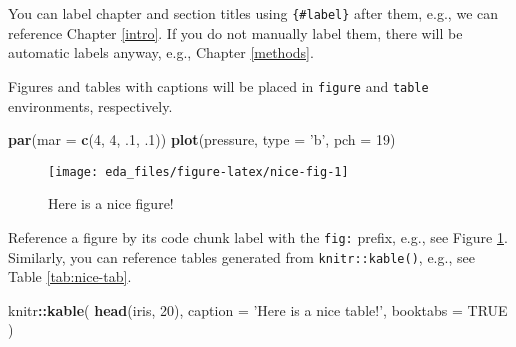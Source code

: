 \documentclass[]{book}
\newenvironment{Shaded}{\begin{snugshade}}{\end{snugshade}}
\newcommand{\KeywordTok}[1]{\textcolor[rgb]{0.13,0.29,0.53}{\textbf{#1}}}
\newcommand{\DataTypeTok}[1]{\textcolor[rgb]{0.13,0.29,0.53}{#1}}
\newcommand{\DecValTok}[1]{\textcolor[rgb]{0.00,0.00,0.81}{#1}}
\newcommand{\StringTok}[1]{\textcolor[rgb]{0.31,0.60,0.02}{#1}}
\newcommand{\OtherTok}[1]{\textcolor[rgb]{0.56,0.35,0.01}{#1}}
\newcommand{\OperatorTok}[1]{\textcolor[rgb]{0.81,0.36,0.00}{\textbf{#1}}}
\newcommand{\NormalTok}[1]{#1}
\theoremstyle{definition}
\theoremstyle{definition}
\theoremstyle{definition}
\theoremstyle{remark}
\begin{document}
You can label chapter and section titles using \texttt{\{\#label\}}
after them, e.g., we can reference Chapter \ref{intro}. If you do not
manually label them, there will be automatic labels anyway, e.g.,
Chapter \ref{methods}.

Figures and tables with captions will be placed in \texttt{figure} and
\texttt{table} environments, respectively.

\begin{Shaded}
\begin{Highlighting}[]
\KeywordTok{par}\NormalTok{(}\DataTypeTok{mar =} \KeywordTok{c}\NormalTok{(}\DecValTok{4}\NormalTok{, }\DecValTok{4}\NormalTok{, .}\DecValTok{1}\NormalTok{, .}\DecValTok{1}\NormalTok{))}
\KeywordTok{plot}\NormalTok{(pressure, }\DataTypeTok{type =} \StringTok{'b'}\NormalTok{, }\DataTypeTok{pch =} \DecValTok{19}\NormalTok{)}
\end{Highlighting}
\end{Shaded}

\begin{figure}

{\centering \texttt{[image: eda\_files/figure-latex/nice-fig-1]} 

}

\caption{Here is a nice figure!}\label{fig:nice-fig}
\end{figure}

Reference a figure by its code chunk label with the \texttt{fig:}
prefix, e.g., see Figure \ref{fig:nice-fig}. Similarly, you can
reference tables generated from \texttt{knitr::kable()}, e.g., see Table
\ref{tab:nice-tab}.

\begin{Shaded}
\begin{Highlighting}[]
\NormalTok{knitr}\OperatorTok{::}\KeywordTok{kable}\NormalTok{(}
  \KeywordTok{head}\NormalTok{(iris, }\DecValTok{20}\NormalTok{), }\DataTypeTok{caption =} \StringTok{'Here is a nice table!'}\NormalTok{,}
  \DataTypeTok{booktabs =} \OtherTok{TRUE}
\NormalTok{)}
\end{Highlighting}
\end{Shaded}
\end{document}
